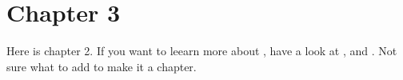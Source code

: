 \chapter{Chapter 3}\label{ch:ch3label}
Here is chapter 2. If you want to leearn  more about \LaTeXe{}, have a look at \cite{Madsen2010}, \cite{Oetiker2010} and \cite{Mittelbach2005}. Not sure what to add to make it a chapter.
